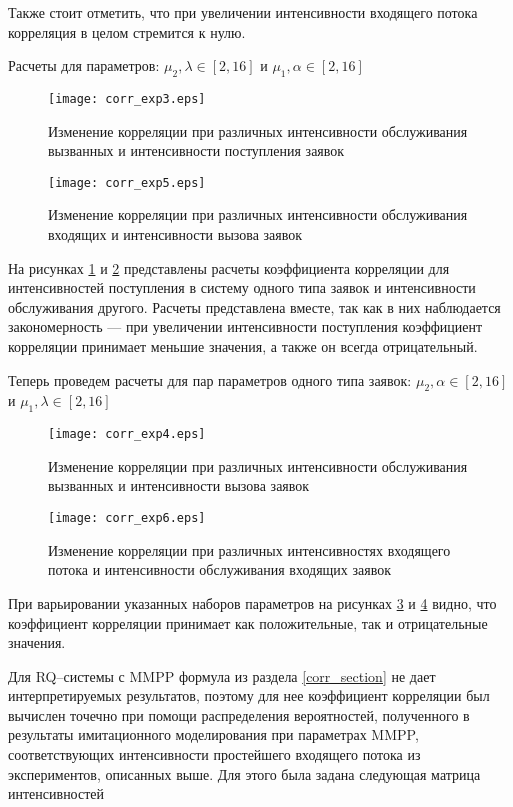 Также стоит отметить, что при увеличении интенсивности входящего потока корреляция в целом стремится к нулю.

Расчеты для параметров: $\mu_{2},\lambda \in [2,16]$ и $\mu_{1},\alpha \in [2,16]$
\begin{figure}[H]
	\centering
	\texttt{[image: corr\_exp3.eps]}
	\caption{Изменение корреляции при различных интенсивности обслуживания вызванных и интенсивности поступления заявок}
	\label{exps_corr_exp3}
\end{figure} 

\begin{figure}[H]
	\centering
	\texttt{[image: corr\_exp5.eps]}
	\caption{Изменение корреляции при различных интенсивности обслуживания входящих и интенсивности вызова заявок}
	\label{exps_corr_exp5}
\end{figure} 

На рисунках \ref{exps_corr_exp3} и \ref{exps_corr_exp5} представлены расчеты коэффициента корреляции для интенсивностей поступления в систему одного типа заявок и интенсивности обслуживания другого. Расчеты представлена вместе, так как в них наблюдается закономерность --- при увеличении интенсивности поступления коэффициент корреляции принимает меньшие значения, а также он всегда отрицательный.

Теперь проведем расчеты для пар параметров одного типа заявок: $\mu_{2},\alpha \in [2,16]$ и $\mu_{1},\lambda \in [2,16]$
\begin{figure}[H]
	\centering
	\texttt{[image: corr\_exp4.eps]}
	\caption{Изменение корреляции при различных интенсивности обслуживания вызванных и интенсивности вызова заявок}
	\label{exps_corr_exp4}
\end{figure} 

\begin{figure}[H]
	\centering
	\texttt{[image: corr\_exp6.eps]}
	\caption{Изменение корреляции при различных интенсивностях входящего потока и интенсивности обслуживания входящих заявок}
	\label{exps_corr_exp6}
\end{figure} 

При варьировании указанных наборов параметров на рисунках \ref{exps_corr_exp4} и \ref{exps_corr_exp6} видно, что коэффициент корреляции принимает как положительные, так и отрицательные значения.

Для RQ--системы с MMPP формула из раздела \ref{corr_section} не дает интерпретируемых результатов, поэтому для нее коэффициент корреляции был вычислен точечно при помощи распределения вероятностей, полученного в результаты имитационного моделирования при параметрах MMPP, соответствующих интенсивности простейшего входящего потока из экспериментов, описанных выше. Для этого была задана следующая матрица интенсивностей

